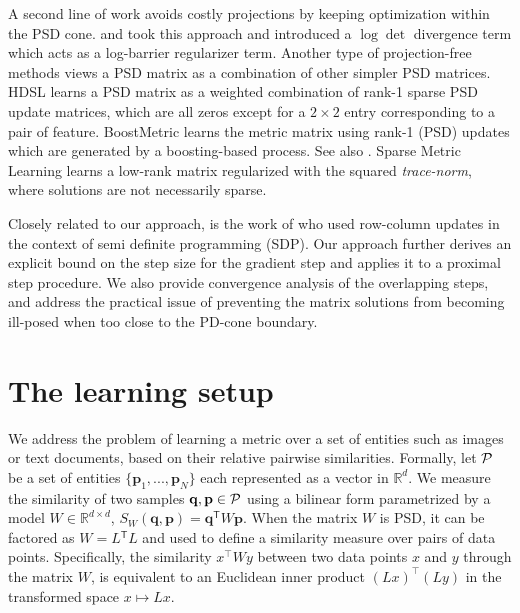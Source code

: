 \documentclass[twoside,11pt]{article}
\newcommand\mat[1]{{#1}}
\renewcommand\vec[1]{\mathbf{#1}}
\newcommand{\T}{{}^\mathsf{T}}
\newcommand{\W}{\mat{W}}
\newcommand{\Rd}{\mathbb{R}^d}
\newcommand{\ignore}[1]{}
\newcommand{\q}{{\vec{q}}}
\newcommand{\p}{{\vec{p}}}
\newcommand{\cholL}{\mat{L}}
\begin{document}
A second line of work avoids costly projections by keeping optimization within the PSD cone. \citet{davis2007information} and \citet{lego} took this approach and introduced a $\log \det$ divergence term which acts as a log-barrier regularizer term. Another type of projection-free methods views a PSD matrix as a combination of other simpler PSD matrices. HDSL \citep{HDSL} learns a PSD matrix as a weighted combination of rank-1 sparse PSD update matrices, which are all zeros except for a $2\times2$ entry corresponding to a pair of feature. BoostMetric \citep{boost} learns the metric matrix using rank-1 (PSD) updates which are generated by a boosting-based process. See also \citet{bi2011adaboost, liu2012robust}. Sparse Metric Learning \citep{ying2009sparse} learns a low-rank matrix regularized with the squared \emph{trace-norm}, where solutions are not necessarily sparse.
\ignore{This yields low-rank but not truly sparse metrics. Their method also has a slower convergence rate, and is based on iteratively solving $|T|$-dimensional quadratic problems with linear constraints, where $|T|$ is the number of training triplets, as well as requiring a repeated full eigendecompositions.}

Closely related to our approach, is the work of \citet{wenRBR} who used row-column updates in the context of semi definite programming (SDP). Our approach further derives an explicit bound on the step size for the gradient step and applies it to a proximal step procedure. We also provide convergence analysis of the overlapping steps, and address the practical issue of preventing the matrix solutions from becoming ill-posed when too close to the PD-cone boundary.

\vspace{-6pt}
\section{The learning setup}
\vskip -5pt
We address the problem of learning a metric over a set of
entities such as images or text documents, based on their
relative pairwise similarities. Formally, let $\cal{P}$ be a set of entities $\{\p_1,...,\p_N\}$ each represented as a vector in $\Rd$. We measure the similarity of two samples $\q, \p \in \cal{P}$ using a bilinear form parametrized by a model $\W \in \mathbb{R}^{d \times d}$, $S_{\W}(\q, \p) = \q\T \W \p$.
When the matrix $\W$ is PSD, it can be factored as $\W = \cholL\T \cholL$ and used to define a similarity measure over pairs of data points. Specifically, the similarity $x^\top\W y$ between two data points $x$ and $y$ through the matrix $\W$, is equivalent to an Euclidean inner product  $(\cholL x)^\top(\cholL y)$ in the transformed space $x \mapsto \cholL x$. 
\end{document}
